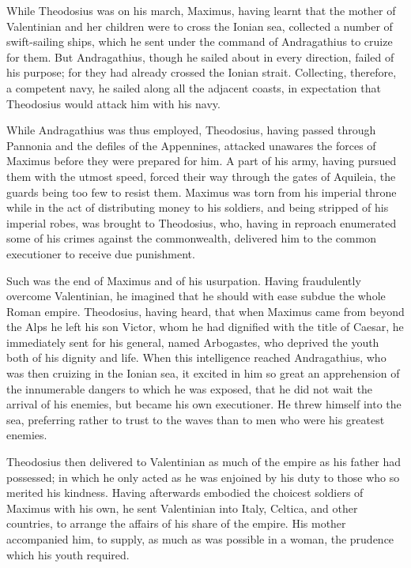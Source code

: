 While Theodosius was on his march, Maximus, having learnt that the mother of Valentinian and her children were to cross the Ionian sea, collected a number of swift-sailing ships, which he sent under the command of Andragathius to cruize for them. But Andragathius, though he sailed about in every direction, failed of his purpose; for they had already crossed the Ionian strait. Collecting, therefore, a competent navy, he sailed along all the adjacent coasts, in expectation that Theodosius would attack him with his navy.

While Andragathius was thus employed, Theodosius, having passed through Pannonia and the defiles of the Appennines, attacked unawares the forces of Maximus before they were prepared for him. A part of his army, having pursued them with the utmost speed, forced their way through the gates of Aquileia, the guards being too few to resist them. Maximus was torn from his imperial throne while in the act of distributing money to his soldiers, and being stripped of his imperial robes, was brought to Theodosius, who, having in reproach enumerated some of his crimes against the commonwealth, delivered him to the common executioner to receive due punishment.

Such was the end of Maximus and of his usurpation. Having fraudulently overcome Valentinian, he imagined that he should with ease subdue the whole Roman empire. Theodosius, having heard, that when Maximus came from beyond the Alps he left his son Victor, whom he had dignified with the title of Caesar, he immediately sent for his general, named Arbogastes, who deprived the youth both of his dignity and life. When this intelligence reached Andragathius, who was then cruizing in the Ionian sea, it excited in him so great an apprehension of the innumerable dangers to which he was exposed, that he did not wait the arrival of his enemies, but became his own executioner. He threw himself into the sea, preferring rather to trust to the waves than to men who were his greatest enemies.

Theodosius then delivered to Valentinian as much of the empire as his father had possessed; in which he only acted as he was enjoined by his duty to those who so merited his kindness. Having afterwards embodied the choicest soldiers of Maximus with his own, he sent Valentinian into Italy, Celtica, and other countries, to arrange the affairs of his share of the empire. His mother accompanied him, to supply, as much as was possible in a woman, the prudence which his youth required.

